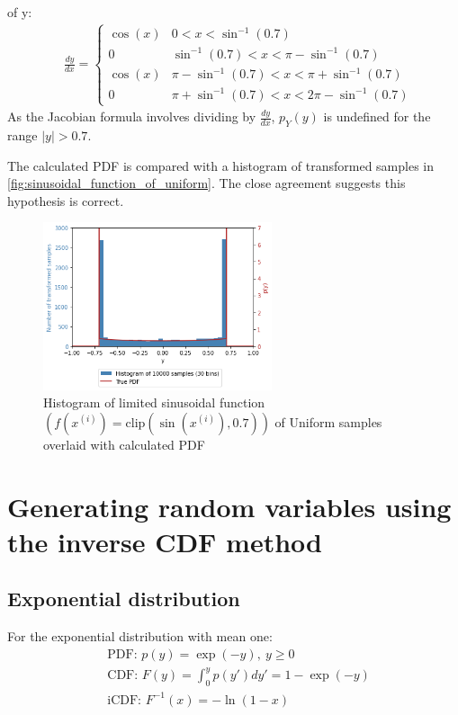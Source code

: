 \documentclass[a4paper]{article}
\begin{document}
of y:
\begin{align*}
    & \frac{dy}{dx} =
    \begin{cases}
        \cos(x) & 0 < x < \sin^{-1}(0.7) \\
        0 & \sin^{-1}(0.7) < x < \pi - \sin^{-1}(0.7) \\
        \cos(x) & \pi - \sin^{-1}(0.7) < x < \pi + \sin^{-1}(0.7) \\
        0 & \pi + \sin^{-1}(0.7) < x < 2\pi - \sin^{-1}(0.7)
   \end{cases}
\end{align*}
As the Jacobian formula involves dividing by $\frac{dy}{dx}$, $p_Y(y)$ is undefined for the range
$|y| > 0.7$.

The calculated PDF is compared with a histogram of transformed samples in \autoref{fig:sinusoidal_function_of_uniform}.
The close agreement suggests this hypothesis is correct.

\begin{figure}[h]
    \centering
    \includegraphics[width=0.6\textwidth]{figures/limited_sinusoidal_function_of_uniform.png}
    \caption{Histogram of limited sinusoidal function $\left(f(x^{(i)}) = \text{clip}\left(\sin\left(x^{(i)}\right), 0.7\right)\right)$
        of Uniform samples overlaid with calculated PDF}
    \label{fig:limited_sinusoidal_function_of_uniform}
\end{figure}




\section{Generating random variables using the inverse CDF method}

\subsection{Exponential distribution}
For the exponential distribution with mean one:
\begin{align*}
    & \text{PDF: } p(y) = \exp(-y), \ y \geq 0 \\
    & \text{CDF: } F(y) = \int_0^y p(y') dy' = 1 - \exp(-y) \\
    & \text{iCDF: } F^{-1}(x) = -\ln(1 - x)
\end{align*}
\end{document}
